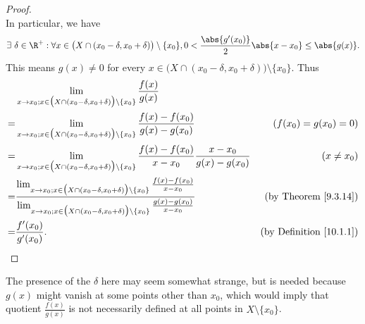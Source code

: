 \begin{proof}
\[    \]
    In particular, we have
    \[
        \exists\ \delta \in \R^+ : \forall x \in \big(X \cap (x_0 - \delta, x_0 + \delta)\big) \setminus \{x_0\}, 0 < \frac{\abs{g'(x_0)}}{2} \abs{x - x_0} \leq \abs{g(x)}.
    \]
    This means \(g(x) \neq 0\) for every \(x \in \big(X \cap (x_0 - \delta, x_0 + \delta)\big) \setminus \{x_0\}\).
    Thus
    \begin{align*}
          & \lim_{x \to x_0 ; x \in \big(X \cap (x_0 - \delta, x_0 + \delta)\big) \setminus \{x_0\}} \frac{f(x)}{g(x)}                                                                                                                                                                                  \\
        = & \lim_{x \to x_0 ; x \in \big(X \cap (x_0 - \delta, x_0 + \delta)\big) \setminus \{x_0\}} \frac{f(x) - f(x_0)}{g(x) - g(x_0)}                                                                                                                          & (f(x_0) = g(x_0) = 0)               \\
        = & \lim_{x \to x_0 ; x \in \big(X \cap (x_0 - \delta, x_0 + \delta)\big) \setminus \{x_0\}} \frac{f(x) - f(x_0)}{x - x_0} \frac{x - x_0}{g(x) - g(x_0)}                                                                                                  & (x \neq x_0)                        \\
        = & \frac{\lim_{x \to x_0 ; x \in \big(X \cap (x_0 - \delta, x_0 + \delta)\big) \setminus \{x_0\}} \frac{f(x) - f(x_0)}{x - x_0}}{\lim_{x \to x_0 ; x \in \big(X \cap (x_0 - \delta, x_0 + \delta)\big) \setminus \{x_0\}} \frac{g(x) - g(x_0)}{x - x_0}} & \text{(by Theorem \ref{9.3.14})}    \\
        = & \frac{f'(x_0)}{g'(x_0)}.                                                                                                                                                                                                                              & \text{(by Definition \ref{10.1.1})}
    \end{align*}
\end{proof}

\begin{note}
    The presence of the \(\delta\) here may seem somewhat strange, but is needed because \(g(x)\) might vanish at some points other than \(x_0\), which would imply that quotient \(\frac{f(x)}{g(x)}\) is not necessarily defined at all points in \(X \setminus \{x_0\}\).
\end{note}

